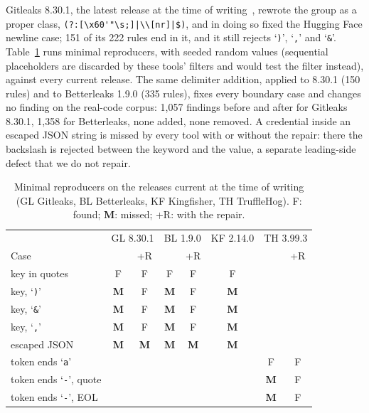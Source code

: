 \documentclass[10pt,journal,compsoc]{IEEEtran}
\begin{document}
Gitleaks 8.30.1, the latest release at the time of writing~\cite{gitleaks830}, rewrote the group as a proper class, \lstinline!(?:[\x60'"\s;]|\\[nr]|$)!, and in doing so fixed the Hugging Face newline case; 151 of its 222 rules end in it, and it still rejects `\texttt{)}', `\texttt{,}' and `\texttt{\&}'. Table~\ref{tab:current} runs minimal reproducers, with seeded random values (sequential placeholders are discarded by these tools' filters and would test the filter instead), against every current release. The same delimiter addition, applied to 8.30.1 (150 rules) and to Betterleaks 1.9.0 (335 rules), fixes every boundary case and changes no finding on the real-code corpus: 1{,}057 findings before and after for Gitleaks 8.30.1, 1{,}358 for Betterleaks, none added, none removed. A credential inside an escaped JSON string is missed by every tool with or without the repair: there the backslash is rejected between the keyword and the value, a separate leading-side defect that we do not repair.

\begin{table}[t]
\centering
\caption{Minimal reproducers on the releases current at the time of writing (GL Gitleaks, BL Betterleaks, KF Kingfisher, TH TruffleHog). F: found; \textbf{M}: missed; +R: with the repair.}
\label{tab:current}
\footnotesize
\setlength{\tabcolsep}{2.2pt}
\begin{tabular}{@{}lccccccc@{}}
\toprule
 & \multicolumn{2}{c}{GL 8.30.1} & \multicolumn{2}{c}{BL 1.9.0} & KF 2.14.0 & \multicolumn{2}{c}{TH 3.99.3} \\
Case & & +R & & +R & & & +R \\
\midrule
key in quotes & F & F & F & F & F & & \\
key, `\texttt{)}' & \textbf{M} & F & \textbf{M} & F & \textbf{M} & & \\
key, `\texttt{\&}' & \textbf{M} & F & \textbf{M} & F & \textbf{M} & & \\
key, `\texttt{,}' & \textbf{M} & F & \textbf{M} & F & \textbf{M} & & \\
escaped JSON & \textbf{M} & \textbf{M} & \textbf{M} & \textbf{M} & \textbf{M} & & \\
token ends `\texttt{a}' & & & & & & F & F \\
token ends `\texttt{-}', quote & & & & & & \textbf{M} & F \\
token ends `\texttt{-}', EOL & & & & & & \textbf{M} & F \\
\bottomrule
\end{tabular}
\end{table}
\end{document}
